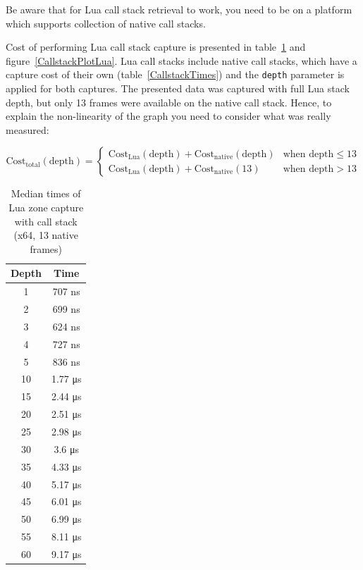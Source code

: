 \documentclass[hidelinks,titlepage,a4paper]{article}
\begin{document}
Be aware that for Lua call stack retrieval to work, you need to be on a platform which supports collection of native call stacks.

Cost of performing Lua call stack capture is presented in table~\ref{CallstackTimesLua} and figure~\ref{CallstackPlotLua}. Lua call stacks include native call stacks, which have a capture cost of their own (table~\ref{CallstackTimes}) and the \texttt{depth} parameter is applied for both captures. The presented data was captured with full Lua stack depth, but only 13 frames were available on the native call stack. Hence, to explain the non-linearity of the graph you need to consider what was really measured:

\begin{displaymath}
\text{Cost}_{\text{total}}(\text{depth}) =
\begin{cases}
\text{Cost}_{\text{Lua}}(\text{depth}) + \text{Cost}_{\text{native}}(\text{depth}) & \text{when depth} \leq 13 \\
\text{Cost}_{\text{Lua}}(\text{depth}) + \text{Cost}_{\text{native}}(13) & \text{when depth} > 13
\end{cases}
\end{displaymath}

\begin{table}[h]
\centering
\begin{tabular}[h]{c|c}
\textbf{Depth} & \textbf{Time} \\ \hline
1 & 707 \si{\nano\second} \\
2 & 699 \si{\nano\second} \\
3 & 624 \si{\nano\second} \\
4 & 727 \si{\nano\second} \\
5 & 836 \si{\nano\second} \\
10 & 1.77 \si{\micro\second} \\
15 & 2.44 \si{\micro\second} \\
20 & 2.51 \si{\micro\second} \\
25 & 2.98 \si{\micro\second} \\
30 & 3.6 \si{\micro\second} \\
35 & 4.33 \si{\micro\second} \\
40 & 5.17 \si{\micro\second} \\
45 & 6.01 \si{\micro\second} \\
50 & 6.99 \si{\micro\second} \\
55 & 8.11 \si{\micro\second} \\
60 & 9.17 \si{\micro\second}
\end{tabular}
\caption{Median times of Lua zone capture with call stack (x64, 13 native frames)}
\label{CallstackTimesLua}
\end{table}
\end{document}
